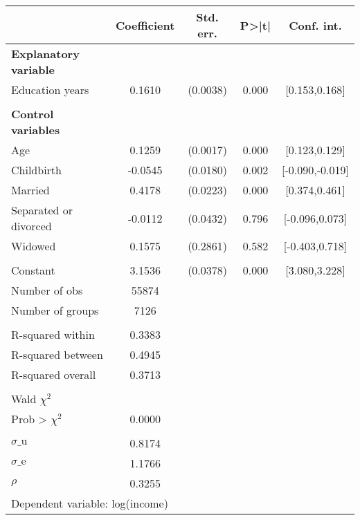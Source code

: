 {
\def\sym#1{\ifmmode^{#1}\else\(^{#1}\)\fi}
\begin{tabular}{l*{1}{cccc}}
\toprule
                    & Coefficient&   Std. err.&       P>|t|&  Conf. int.\\
\midrule
\textbf{Explanatory variable}&            &            &            &            \\
Education years     &      0.1610&    (0.0038)&       0.000&[0.153,0.168]\\
\\ \textbf{Control variables}&            &            &            &            \\
Age                 &      0.1259&    (0.0017)&       0.000&[0.123,0.129]\\
Childbirth          &     -0.0545&    (0.0180)&       0.002&[-0.090,-0.019]\\
Married             &      0.4178&    (0.0223)&       0.000&[0.374,0.461]\\
Separated or divorced&     -0.0112&    (0.0432)&       0.796&[-0.096,0.073]\\
Widowed             &      0.1575&    (0.2861)&       0.582&[-0.403,0.718]\\
                    &            &            &            &            \\
Constant            &      3.1536&    (0.0378)&       0.000&[3.080,3.228]\\
\midrule
Number of obs       &       55874&            &            &            \\
Number of groups    &        7126&            &            &            \\
\\ R-squared within &      0.3383&            &            &            \\
R-squared between   &      0.4945&            &            &            \\
R-squared overall   &      0.3713&            &            &            \\
\\ Wald $\chi^2$    &            &            &            &            \\
Prob > $\chi^2$     &      0.0000&            &            &            \\
\\ $\sigma\text{\_u}$&      0.8174&            &            &            \\
$\sigma\text{\_e}$   &      1.1766&            &            &            \\
$\rho$              &      0.3255&            &            &            \\
\bottomrule
\multicolumn{5}{l}{\footnotesize Dependent variable: log(income)}\\
\end{tabular}
}
